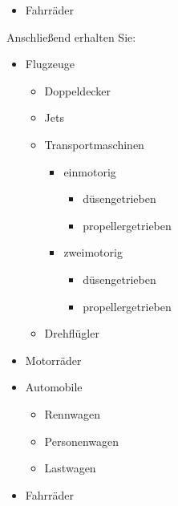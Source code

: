\begin{Example}
\begin{lstcode}
\begin{itemize}
\begin{itemize}
    \item Personenwagen
    \item Lastwagen
    \end{itemize}
  \item Fahrräder
  \end{itemize}
 \end{lstcode}
      Anschließend erhalten Sie:%
      \begin{ShowOutput}[.5\baselineskip]
        \begin{itemize}
        \item Flugzeuge
          \begin{itemize}
          \item Doppeldecker
          \item Jets
          \item Transportmaschinen
            \begin{itemize}
            \item einmotorig
              \begin{itemize}
              \item{düsengetrieben}
              \item{propellergetrieben}
              \end{itemize}
            \item zweimotorig
              \begin{itemize}
              \item{düsengetrieben}
              \item{propellergetrieben}
              \end{itemize}
            \end{itemize}
          \item Drehflügler
          \end{itemize}
        \item Motorräder
        \item Automobile
          \begin{itemize}
          \item Rennwagen
          \item Personenwagen
          \item Lastwagen
          \end{itemize}
        \item Fahrräder
        \end{itemize}
      \end{ShowOutput}
    \end{Example}%
  \fi
  \EndIndexGroup


